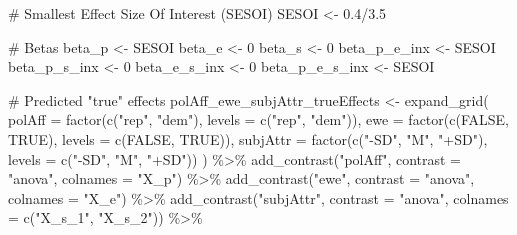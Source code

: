\documentclass[
  letterpaper,
  DIV=11,
  numbers=noendperiod]{scrartcl}
\newenvironment{Shaded}{\begin{snugshade}}{\end{snugshade}}
\newcommand{\AttributeTok}[1]{\textcolor[rgb]{0.40,0.45,0.13}{#1}}
\newcommand{\CommentTok}[1]{\textcolor[rgb]{0.37,0.37,0.37}{#1}}
\newcommand{\ConstantTok}[1]{\textcolor[rgb]{0.56,0.35,0.01}{#1}}
\newcommand{\DecValTok}[1]{\textcolor[rgb]{0.68,0.00,0.00}{#1}}
\newcommand{\FloatTok}[1]{\textcolor[rgb]{0.68,0.00,0.00}{#1}}
\newcommand{\FunctionTok}[1]{\textcolor[rgb]{0.28,0.35,0.67}{#1}}
\newcommand{\NormalTok}[1]{\textcolor[rgb]{0.00,0.23,0.31}{#1}}
\newcommand{\OtherTok}[1]{\textcolor[rgb]{0.00,0.23,0.31}{#1}}
\newcommand{\SpecialCharTok}[1]{\textcolor[rgb]{0.37,0.37,0.37}{#1}}
\newcommand{\StringTok}[1]{\textcolor[rgb]{0.13,0.47,0.30}{#1}}
\begin{document}
\begin{Shaded}
\begin{Highlighting}[]
\CommentTok{\# Smallest Effect Size Of Interest (SESOI)}
\NormalTok{SESOI }\OtherTok{\textless{}{-}} \FloatTok{0.4}\SpecialCharTok{/}\FloatTok{3.5}

\CommentTok{\# Betas}
\NormalTok{beta\_p }\OtherTok{\textless{}{-}}\NormalTok{ SESOI}
\NormalTok{beta\_e }\OtherTok{\textless{}{-}} \DecValTok{0}
\NormalTok{beta\_s }\OtherTok{\textless{}{-}} \DecValTok{0}
\NormalTok{beta\_p\_e\_inx }\OtherTok{\textless{}{-}}\NormalTok{ SESOI}
\NormalTok{beta\_p\_s\_inx }\OtherTok{\textless{}{-}} \DecValTok{0}
\NormalTok{beta\_e\_s\_inx }\OtherTok{\textless{}{-}} \DecValTok{0}
\NormalTok{beta\_p\_e\_s\_inx }\OtherTok{\textless{}{-}}\NormalTok{ SESOI}

\CommentTok{\# Predicted "true" effects}
\NormalTok{polAff\_ewe\_subjAttr\_trueEffects }\OtherTok{\textless{}{-}} \FunctionTok{expand\_grid}\NormalTok{(}
  \AttributeTok{polAff =} \FunctionTok{factor}\NormalTok{(}\FunctionTok{c}\NormalTok{(}\StringTok{"rep"}\NormalTok{, }\StringTok{"dem"}\NormalTok{), }\AttributeTok{levels =} \FunctionTok{c}\NormalTok{(}\StringTok{"rep"}\NormalTok{, }\StringTok{"dem"}\NormalTok{)),}
  \AttributeTok{ewe =} \FunctionTok{factor}\NormalTok{(}\FunctionTok{c}\NormalTok{(}\ConstantTok{FALSE}\NormalTok{, }\ConstantTok{TRUE}\NormalTok{), }\AttributeTok{levels =} \FunctionTok{c}\NormalTok{(}\ConstantTok{FALSE}\NormalTok{, }\ConstantTok{TRUE}\NormalTok{)),}
  \AttributeTok{subjAttr =} \FunctionTok{factor}\NormalTok{(}\FunctionTok{c}\NormalTok{(}\StringTok{"{-}SD"}\NormalTok{, }\StringTok{"M"}\NormalTok{, }\StringTok{"+SD"}\NormalTok{), }\AttributeTok{levels =} \FunctionTok{c}\NormalTok{(}\StringTok{"{-}SD"}\NormalTok{, }\StringTok{"M"}\NormalTok{, }\StringTok{"+SD"}\NormalTok{))}
\NormalTok{) }\SpecialCharTok{\%\textgreater{}\%} 
  \FunctionTok{add\_contrast}\NormalTok{(}\StringTok{"polAff"}\NormalTok{, }\AttributeTok{contrast =} \StringTok{"anova"}\NormalTok{, }\AttributeTok{colnames =} \StringTok{"X\_p"}\NormalTok{) }\SpecialCharTok{\%\textgreater{}\%} 
  \FunctionTok{add\_contrast}\NormalTok{(}\StringTok{"ewe"}\NormalTok{, }\AttributeTok{contrast =} \StringTok{"anova"}\NormalTok{, }\AttributeTok{colnames =} \StringTok{"X\_e"}\NormalTok{) }\SpecialCharTok{\%\textgreater{}\%} 
  \FunctionTok{add\_contrast}\NormalTok{(}\StringTok{"subjAttr"}\NormalTok{, }\AttributeTok{contrast =} \StringTok{"anova"}\NormalTok{, }\AttributeTok{colnames =} \FunctionTok{c}\NormalTok{(}\StringTok{"X\_s\_1"}\NormalTok{, }\StringTok{"X\_s\_2"}\NormalTok{)) }\SpecialCharTok{\%\textgreater{}\%} 

\end{Highlighting}
\end{Shaded}
\end{document}
